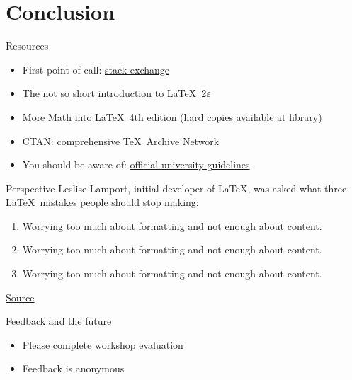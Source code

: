 \section*{Conclusion}

\addtocounter{section}{1}

\begin{frame}{Resources}
  \begin{itemize}
    \item First point of call:
      \href{https://tex.stackexchange.com/}{stack exchange}
    \item \href{https://tobi.oetiker.ch/lshort/lshort.pdf}%
      {The not so short introduction to \LaTeX\ 2$\varepsilon$}
    \item \href{https://link.springer.com/content/pdf/10.1007\%2F978-0-387-68852-7.pdf}%
      {More Math into \LaTeX\ 4th edition} (hard copies available at library)
    \item \href{https://www.ctan.org/}{CTAN}: comprehensive \TeX\ Archive
      Network
    \item You should be aware of:
      \href{https://www.ncl.ac.uk/students/progress/assets/documents/GuidelinesfortheSubmissionandFormatofThesis-January2018.pdf}%
      {official university guidelines}
  \end{itemize}
\end{frame}

\begin{frame}{Perspective}
  Leslise Lamport, initial developer of \LaTeX, was asked what three \LaTeX\
  mistakes people should stop making:
  \begin{enumerate}
    \item Worrying too much about formatting and not enough about content.
    \item Worrying too much about formatting and not enough about content.
    \item Worrying too much about formatting and not enough about content.
  \end{enumerate}
  \href{https://www.microsoft.com/en-us/research/uploads/prod/2016/12/TeX-changed-the-face-of-Mathematics.pdf}%
  {Source}
\end{frame}

\begin{frame}{Feedback and the future}
  \begin{itemize}
    \item Please complete workshop evaluation
    \item Feedback is anonymous
  \end{itemize}
\end{frame}

